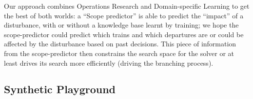 \documentclass{article}
\begin{document}
Our approach combines Operations Research and Domain-specific Learning to get the best of both worlds: a ``Scope predictor'' is able to predict the ``impact'' of a disturbance, with or without a knowledge base learnt by training; we hope the scope-predictor could predict which trains and which departures are or could be affected by the disturbance based on past decisions. This piece of information from the scope-predictor then constrains the search space for the solver or at least drives its search more efficiently (driving the branching process).

\subsection{Synthetic Playground}\label{subsec:playground}
\end{document}

